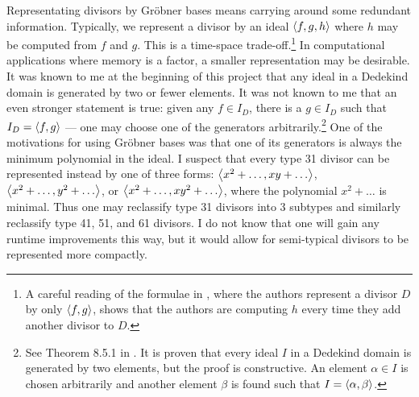 Representating divisors by Gr\"obner bases means carrying around some redundant information.
Typically, we represent a divisor by an ideal $\left\langle f,g,h \right\rangle$ where $h$ may be computed from $f$ and $g$.
This is a time-space trade-off.\footnote{
A careful reading of the formulae in \cite{salem07}, where the authors represent a divisor $D$ by only $\left\langle f,g \right\rangle$,
shows that the authors are computing $h$ every time they add another divisor to $D$.}
In computational applications where memory is a factor, a smaller representation may be desirable.
It was known to me at the beginning of this project that any ideal in a Dedekind domain is generated by two or fewer elements.
It was not known to me that an even stronger statement is true:
given any $f \in I_D$, there is a $g \in I_D$ such that $I_D = \left\langle f,g \right\rangle$ ---
one may choose one of the generators arbitrarily.\footnote{
See Theorem 8.5.1 in \cite{alaca04}. It is proven that every ideal $I$ in a Dedekind domain is generated by two elements,
but the proof is constructive. An element $\alpha \in I$ is chosen arbitrarily and another element $\beta$ is found
such that $I = \left\langle \alpha, \beta \right\rangle$.}
One of the motivations for using Gr\"obner bases was that one of its generators is always the minimum polynomial in the ideal.
I suspect that every type 31 divisor can be represented instead by one of three forms:
$\left\langle x^2 + \ldots, xy + \ldots \right\rangle$, $\left\langle x^2 + \ldots, y^2 + \ldots \right\rangle$, or $\left\langle x^2 + \ldots, xy^2 + \ldots \right\rangle$,
where the polynomial $x^2 + \ldots$ is minimal.
Thus one may reclassify type 31 divisors into 3 subtypes and similarly reclassify type 41, 51, and 61 divisors.
I do not know that one will gain any runtime improvements this way,
but it would allow for semi-typical divisors to be represented more compactly.


